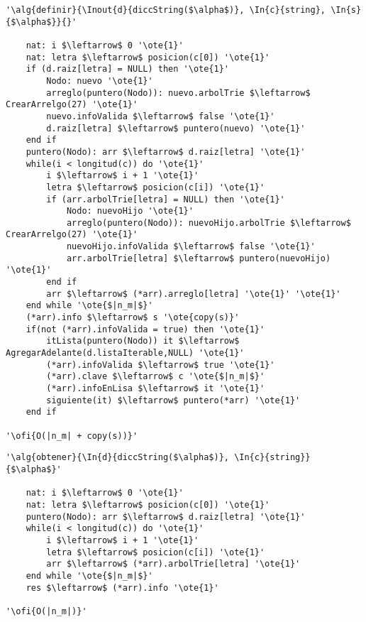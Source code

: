 \begin{lstlisting}[mathescape]
'\alg{definir}{\Inout{d}{diccString($\alpha$)}, \In{c}{string}, \In{s}{$\alpha$}}{}'

	nat: i $\leftarrow$ 0 '\ote{1}'
	nat: letra $\leftarrow$ posicion(c[0]) '\ote{1}'
	if (d.raiz[letra] = NULL) then '\ote{1}'
		Nodo: nuevo '\ote{1}'
		arreglo(puntero(Nodo)): nuevo.arbolTrie $\leftarrow$ CrearArrelgo(27) '\ote{1}'
		nuevo.infoValida $\leftarrow$ false '\ote{1}'
		d.raiz[letra] $\leftarrow$ puntero(nuevo) '\ote{1}'
	end if
	puntero(Nodo): arr $\leftarrow$ d.raiz[letra] '\ote{1}'
	while(i < longitud(c)) do '\ote{1}'
		i $\leftarrow$ i + 1 '\ote{1}'
		letra $\leftarrow$ posicion(c[i]) '\ote{1}'
		if (arr.arbolTrie[letra] = NULL) then '\ote{1}'
			Nodo: nuevoHijo '\ote{1}'
			arreglo(puntero(Nodo)): nuevoHijo.arbolTrie $\leftarrow$ CrearArrelgo(27) '\ote{1}'
			nuevoHijo.infoValida $\leftarrow$ false '\ote{1}'
			arr.arbolTrie[letra] $\leftarrow$ puntero(nuevoHijo) '\ote{1}'	
		end if			
		arr $\leftarrow$ (*arr).arreglo[letra] '\ote{1}' '\ote{1}'
	end while '\ote{$|n_m|$}'
    (*arr).info $\leftarrow$ s '\ote{copy(s)}'
    if(not (*arr).infoValida = true) then '\ote{1}'
    	itLista(puntero(Nodo)) it $\leftarrow$ AgregarAdelante(d.listaIterable,NULL) '\ote{1}'
    	(*arr).infoValida $\leftarrow$ true '\ote{1}'
    	(*arr).clave $\leftarrow$ c '\ote{$|n_m|$}'
    	(*arr).infoEnLisa $\leftarrow$ it '\ote{1}'
    	siguiente(it) $\leftarrow$ puntero(*arr) '\ote{1}'
    end if
    	
'\ofi{O(|n_m| + copy(s))}'
\end{lstlisting}

\begin{lstlisting}[mathescape]
'\alg{obtener}{\In{d}{diccString($\alpha$)}, \In{c}{string}}{$\alpha$}'

	nat: i $\leftarrow$ 0 '\ote{1}'
	nat: letra $\leftarrow$ posicion(c[0]) '\ote{1}'
	puntero(Nodo): arr $\leftarrow$ d.raiz[letra] '\ote{1}'
	while(i < longitud(c)) do '\ote{1}'
		i $\leftarrow$ i + 1 '\ote{1}'
		letra $\leftarrow$ posicion(c[i]) '\ote{1}'
		arr $\leftarrow$ (*arr).arbolTrie[letra] '\ote{1}'
	end while '\ote{$|n_m|$}'
	res $\leftarrow$ (*arr).info '\ote{1}'
	
'\ofi{O(|n_m|)}'
\end{lstlisting}

